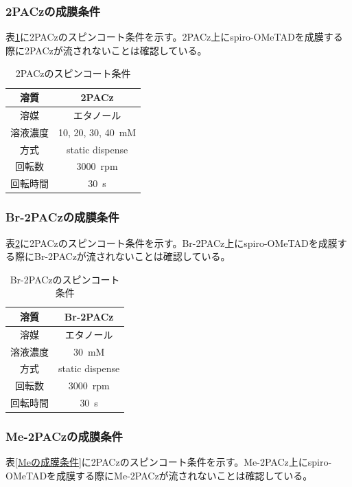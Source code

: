   \subsubsection{2PACzの成膜条件}
  表\ref{Czの成膜条件}に2PACzのスピンコート条件を示す。2PACz上にspiro-OMeTADを成膜する際に2PACzが流されないことは確認している。\cite{片山壮介_修}

  \begin{table}[H] 
	  \centering 
	  \caption{2PACzのスピンコート条件} 
	  \label{Czの成膜条件} 
	  \begin{tabular}{cc} 
	  \hline 
	  溶質&2PACz\\\hline 
	  溶媒&エタノール\\\hline 
	  溶液濃度&10, 20, 30, \SI{40}{mM}\\\hline 
      方式&static dispense\\\hline
	  回転数&\SI{3000}{rpm}\\\hline 
	  回転時間&\SI{30}{s}\\\hline 
  \end{tabular} 
  \end{table}

    \subsubsection{Br-2PACzの成膜条件}
  表\ref{Brの成膜条件}に2PACzのスピンコート条件を示す。Br-2PACz上にspiro-OMeTADを成膜する際にBr-2PACzが流されないことは確認している。\cite{片山壮介_修}

  \begin{table}[H] 
	  \centering 
	  \caption{Br-2PACzのスピンコート条件} 
	  \label{Brの成膜条件} 
	  \begin{tabular}{cc} 
	  \hline 
	  溶質&Br-2PACz\\\hline 
	  溶媒&エタノール\\\hline 
	  溶液濃度&\SI{30}{mM}\\\hline 
      方式&static dispense\\\hline
	  回転数&\SI{3000}{rpm}\\\hline 
	  回転時間&\SI{30}{s}\\\hline 
  \end{tabular} 
  \end{table}

   \subsubsection{Me-2PACzの成膜条件}
  表\ref{Meの成膜条件}に2PACzのスピンコート条件を示す。Me-2PACz上にspiro-OMeTADを成膜する際にMe-2PACzが流されないことは確認している。\cite{片山壮介_修}

